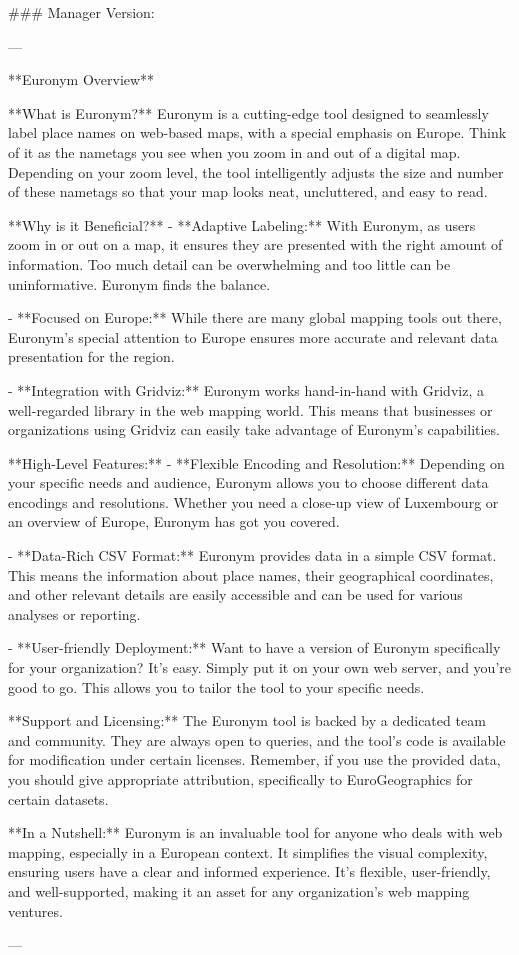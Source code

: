 ### Manager Version:

---

**Euronym Overview**

**What is Euronym?**
Euronym is a cutting-edge tool designed to seamlessly label place names on web-based maps, with a special emphasis on Europe. Think of it as the nametags you see when you zoom in and out of a digital map. Depending on your zoom level, the tool intelligently adjusts the size and number of these nametags so that your map looks neat, uncluttered, and easy to read.

**Why is it Beneficial?**
- **Adaptive Labeling:** With Euronym, as users zoom in or out on a map, it ensures they are presented with the right amount of information. Too much detail can be overwhelming and too little can be uninformative. Euronym finds the balance.
  
- **Focused on Europe:** While there are many global mapping tools out there, Euronym's special attention to Europe ensures more accurate and relevant data presentation for the region.

- **Integration with Gridviz:** Euronym works hand-in-hand with Gridviz, a well-regarded library in the web mapping world. This means that businesses or organizations using Gridviz can easily take advantage of Euronym's capabilities.

**High-Level Features:**
- **Flexible Encoding and Resolution:** Depending on your specific needs and audience, Euronym allows you to choose different data encodings and resolutions. Whether you need a close-up view of Luxembourg or an overview of Europe, Euronym has got you covered.

- **Data-Rich CSV Format:** Euronym provides data in a simple CSV format. This means the information about place names, their geographical coordinates, and other relevant details are easily accessible and can be used for various analyses or reporting.

- **User-friendly Deployment:** Want to have a version of Euronym specifically for your organization? It's easy. Simply put it on your own web server, and you're good to go. This allows you to tailor the tool to your specific needs.

**Support and Licensing:**
The Euronym tool is backed by a dedicated team and community. They are always open to queries, and the tool's code is available for modification under certain licenses. Remember, if you use the provided data, you should give appropriate attribution, specifically to EuroGeographics for certain datasets.

**In a Nutshell:**
Euronym is an invaluable tool for anyone who deals with web mapping, especially in a European context. It simplifies the visual complexity, ensuring users have a clear and informed experience. It's flexible, user-friendly, and well-supported, making it an asset for any organization's web mapping ventures.

---